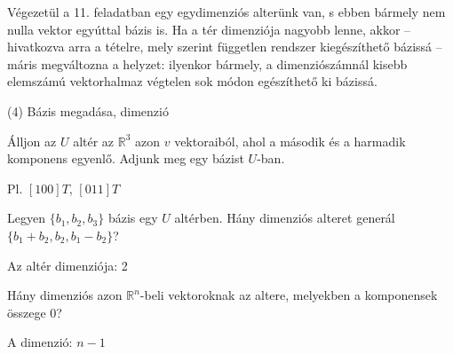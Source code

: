 \begin{frame}
\begin{tcolorbox}[title={3/11. -Q-}]
Végezetül a 11. feladatban egy egydimenziós alterünk van, s ebben bármely nem nulla vektor egyúttal bázis is. Ha a tér dimenziója nagyobb lenne, akkor – hivatkozva arra a tételre, mely szerint független rendszer kiegészíthető bázissá – máris megváltozna a helyzet: ilyenkor bármely, a dimenziószámnál kisebb elemszámú vektorhalmaz végtelen sok módon egészíthető ki bázissá.

  \end{tcolorbox}
\end{frame}



\begin{frame}[plain]
\begin{tcolorbox}[center, colback={myyellow}, coltext={black}, colframe={myyellow}]
    {\RHuge  (4) Bázis megadása, dimenzió}
    \mmedskip
\end{tcolorbox}
\end{frame}

\begin{frame}
  \begin{tcolorbox}[title={4/1. -N-}]
      Álljon az $U$ altér az $\mathbb{R}^3$ azon $v$ vektoraiból, ahol a második és a harmadik komponens egyenlő. Adjunk meg egy bázist $U$-ban.
  \tcblower

    \mmedskip 
    
    Pl. $[1 0 0]T$, $[0 1 1]T$
  \end{tcolorbox}
\end{frame}


\begin{frame}
  \begin{tcolorbox}[title={4/2. -N-}]
      Legyen $\{b_1,b_2,b_3\}$ bázis egy $U$ altérben. Hány dimenziós alteret generál $\{b_1 + b_2,b_2,b_1 -b_2\}$?
  \tcblower

    \mmedskip 
    
    Az altér dimenziója: 2
  \end{tcolorbox}
\end{frame}


\begin{frame}
  \begin{tcolorbox}[title={4/3. -R-}]
      Hány dimenziós azon $\mathbb{R}^n$-beli vektoroknak az altere, melyekben a komponensek összege $0$?
  \tcblower

    \mmedskip 
    
    A dimenzió: $n-1$
  \end{tcolorbox}
\end{frame}


